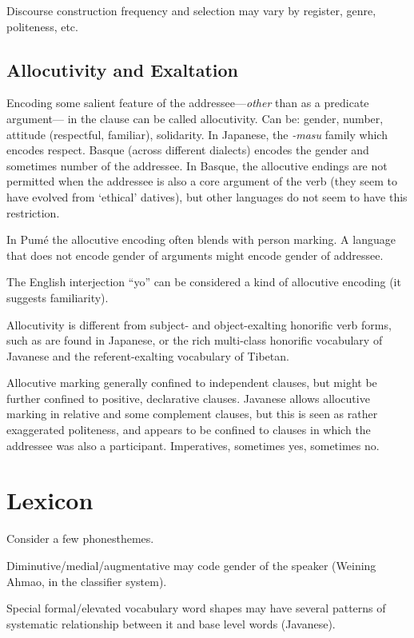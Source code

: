 \documentclass[11pt]{article}
\begin{document}
{Discourse construction frequency and selection may vary by register,
genre, politeness, etc. 

\subsection{Allocutivity and Exaltation} Encoding some salient feature
of the addressee---\textit{other} than as a predicate argument--- in
the clause can be called allocutivity.  Can be: gender, number,
attitude (respectful, familiar), solidarity.  In Japanese, the
\textit{-masu} family which encodes respect.  Basque (across different
dialects) encodes the gender and sometimes number of the addressee.
In Basque, the allocutive endings are not permitted when the addressee
is also a core argument of the verb (they seem to have evolved from
`ethical' datives), but other languages do not seem to have this
restriction.

In Pumé the allocutive encoding often blends with person marking.  A
language that does not encode gender of arguments might encode gender
of addressee.

The English interjection ``yo'' can be considered a kind of allocutive
encoding (it suggests familiarity).

Allocutivity is different from subject- and object-exalting honorific
verb forms, such as are found in Japanese, or the rich multi-class
honorific vocabulary of Javanese and the referent-exalting vocabulary
of Tibetan.

Allocutive marking generally confined to independent clauses, but
might be further confined to positive, declarative clauses.  Javanese
allows allocutive marking in relative and some complement clauses, but
this is seen as rather exaggerated politeness, and appears to be
confined to clauses in which the addressee was also a participant.
Imperatives, sometimes yes, sometimes no.



\section{Lexicon}
Consider a few phonesthemes.

Diminutive/medial/augmentative may code gender of the speaker (Weining
Ahmao, in the classifier system).

Special formal/elevated vocabulary word shapes may have several
patterns of systematic relationship between it and base level words
(Javanese).

}
\end{document}
